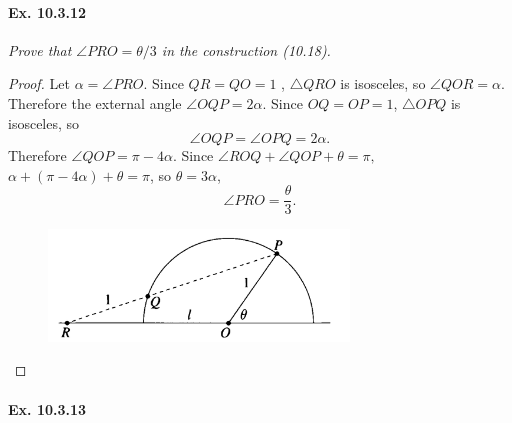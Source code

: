 \documentclass[11pt,a4paper]{article}
\begin{document}
\paragraph{Ex. 10.3.12}

{\it Prove that $\angle PRO = \theta/3$ in the construction (10.18). 
}

\begin{proof} 
 Let $\alpha = \angle PRO$. Since $QR = QO=1$ , $\triangle QRO$ is isosceles, so $\angle QOR = \alpha$. Therefore the external angle $\angle OQP = 2\alpha$. Since $OQ = OP =1$, $\triangle OPQ$ is isosceles, so 
 $$\angle OQP = \angle OPQ = 2\alpha.$$
 Therefore $\angle QOP = \pi - 4\alpha$. Since $\angle ROQ + \angle QOP + \theta = \pi,$ $\alpha + (\pi - 4 \alpha) + \theta = \pi$, so $\theta = 3\alpha$,
 $$\angle PRO = \frac{\theta}{3}.$$
 \begin{figure}[htbp]
\begin{center}
\includegraphics [width=8cm,height=3cm] {Ex_10_3_12.png}
\end{center}
\end{figure}

\end{proof}


\paragraph{Ex. 10.3.13}
\end{document}

